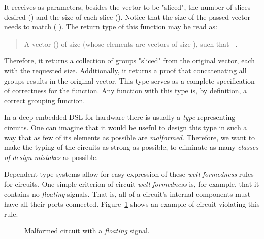     It receives as parameters, besides the vector to be "sliced",
    the number of slices desired () and the size of each slice ().
    Notice that the size of the passed vector needs to match ( \AF{*} ).
    The return type of this function may be read as:

    \begin{quote}
        A vector () of size  (whose elements are vectors of size ),
        such that \texttt{   }.
    \end{quote}

    Therefore, it returns a collection of groups "sliced" from the original vector, each with the requested size.
    Additionally, it returns a proof that concatenating all groups results in the original vector.
    This type serves as a complete specification of correctness for the function.
    Any function with this type is, by definition, a correct grouping function.

    In a deep-embedded \acs{DSL} for hardware there is usually a \emph{type} representing circuits.
    One can imagine that it would be useful to design this type
    in such a way that as few of its elements as possible are \emph{malformed}.
    Therefore, we want to make the typing of the circuits as strong as possible,
    to eliminate as many \emph{classes of design mistakes} as possible.

    Dependent type systems allow for easy expression of these \emph{well-formedness} rules for circuits.
    One simple criterion of circuit \emph{well-formedness} is, for example, that it contains no \emph{floating} signals.
    That is, all of a circuit's internal components must have all their ports connected.
    Figure~\ref{fig:floating-wire} shows an example of circuit violating this rule.

    \begin{figure}[h]
        \caption{Malformed circuit with a \emph{floating} signal. \label{fig:floating-wire}}
    \end{figure}

